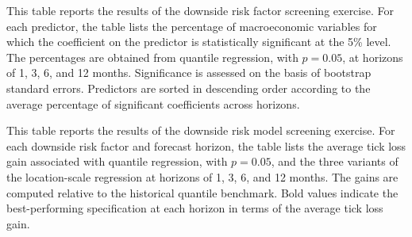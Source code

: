 \documentclass[12pt]{article}
\newcommand{\tablesdir}{tables}
\begin{document}
\setcounter{table}{3}

 \clearpage
 \setcounter{table}{2}
 \begin{table}[!htbp]
 \caption{\sc Downside Risk Factor Screening}\label{tbl:screening:variables}
 \begin{center}
 \begin{footnotesize}
 
 \end{footnotesize}
 \end{center}

  {\hspace{1em} \footnotesize This table reports the results of the downside risk factor screening exercise. For each predictor, the table lists the percentage of macroeconomic variables for which the coefficient on the predictor is statistically significant at the 5\% level. The percentages are obtained from quantile regression, with $p=0.05$, at horizons of 1, 3, 6, and 12 months. Significance is assessed on the basis of bootstrap standard errors. Predictors are sorted in descending order according to the average percentage of significant coefficients across horizons.
  }

 \end{table}

\clearpage
\begin{table}[!htbp]
	\caption{\sc Downside Risk Model Screening}\label{tbl:screening:models}
	\begin{center}
		\begin{tiny}
			
		\end{tiny}
	\end{center}

	{\hspace{1em} \footnotesize This table reports the results of the downside risk model screening exercise. For each downside risk factor and forecast horizon, the table lists the average tick loss gain associated with quantile regression, with $p=0.05$, and the three variants of the location-scale regression at horizons of 1, 3, 6, and 12 months. The gains are computed relative to the historical quantile benchmark. Bold values indicate the best-performing specification at each horizon in terms of the average tick loss gain.
	}

\end{table}
\end{document}
